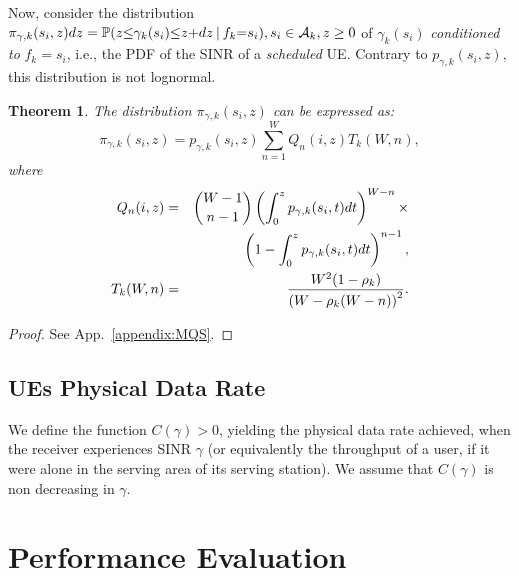 \documentclass[draftcls,onecolumn]{IEEEtran}
\theoremstyle{plain}
\newtheorem{theorem}{Theorem}
\theoremstyle{definition}
\def\st{\mbox{ s.t. }} \def\ie{\mbox{\em i.e., }} \def\wrt{\mbox{\em wrt. }}
\def\st{\mbox{ s.t. }} \def\ie{\mbox{\em i.e., }}
\def\ra{\rightarrow}
\def\bbbone{{\mathchoice {\rm 1\mskip-4mu l} {\rm 1\mskip-4mu l} {\rm
1\mskip-4.5mu l} {\rm 1\mskip-5mu l}}}
\def\charact{\bbbone}
\def\dsp{\displaystyle}
\def\cond{\ |\ }
\begin{document}
Now, consider the distribution $\pi_{\gamma,k}(s_i,z)dz = \mathbb{P}(z {\leq} \gamma_k(s_i) {\leq} z{+}{dz}\hspace{2 pt}| \hspace{2 pt} f_k{=}s_i), s_i \in \mathcal{A}_k, z \geq 0$ of $\gamma_k(s_i)$ {\it conditioned to} $f_k{=}s_i$, i.e., the PDF of the SINR of a {\it scheduled} UE. Contrary to $p_{\gamma,k}(s_i, z)$, this distribution is not lognormal.
\begin{theorem}\label{th:pi}
The distribution $\pi_{\gamma,k}(s_i,z)$ can be expressed as:
\begin{equation}
  \pi_{\gamma,k}(s_i,z)=p_{\gamma,k}(s_i,z) \displaystyle \sum_{n=1}^{W} Q_n(i,z) T_k(W,n),
\end{equation}
where 
\begin{eqnarray}
Q_n(i,z)  &=& \binom{W-1}{n-1}\left( \int_{0}^{z} p_{\gamma,k}(s_i,t)dt\right)^{W-n} \times \notag \\ & & \left(1- \int_{0}^{z} p_{\gamma,k}(s_i,t)dt \right)^{n-1}, \notag \\
T_k(W,n)  &=& \frac{ W^2(1-\rho_k)} { \left(W-\rho_k(W-n)\right)^2}. \notag
\end{eqnarray}
\end{theorem}
\begin{proof}
See App.~\ref{appendix:MQS}.
\end{proof}
  

\subsection{UEs Physical Data Rate}
We define the function $C(\gamma)>0$, yielding the physical data rate achieved, when the receiver experiences SINR $\gamma$ (or equivalently the throughput of a user, if it were alone in the serving area of its serving station). We assume that $C(\gamma)$ is non decreasing in $\gamma$. 


 
\section{Performance Evaluation} \label{perf_eval}



\def\dsp{\displaystyle}

\def\ie{\mbox{ {\em i.e.} }} \def\st{\mbox{ {\em s.t.} }} 

\def\st{\mbox{ s.t. }} \def\resp{\mbox{resp.~}}

\def\Demo{\mbox{\em{Proof: }}}
\def\QED{\ \ \hfill QED \enspace.}
\def\ra{\rightarrow}
\def\Ra{\Rightarrow}
\def\lra{\leftrightarrow}
\def\Lra{\Leftrightarrow}
\def\cond{\ |\ }
\def\Xt{X^t}
\def\alphait{\alpha_i(t)}
\def\alphajt{\boldsymbol{\alpha}_{-i}(t)}
\def\Pt{\mathbb{P}_{\boldsymbol{\alpha}}}
\def\alphai{\alpha_i}
\def\alphaj{\boldsymbol{\alpha}_{-i}}
\def\ui{u_i}
\def\uj{\boldsymbol{u_j}}
\newcommand{\bbbe}{{\mathbb{E}}} 
\def\bbbone{{\mathchoice {\rm 1\mskip-4mu l} {\rm 1\mskip-4mu l} {\rm
1\mskip-4.5mu l} {\rm 1\mskip-5mu l}}} 
\def\charact#1{\bbbone_{#1}} \def\Esp#1{\bbbe\, \left[\, {#1} \, \right]} \def\Espt#1{\bbbe_{\boldsymbol{\alpha}}\, \left[\, {#1} \,\right]} \def\Esptt#1#2{\Espt{#2}} 
\end{document}
